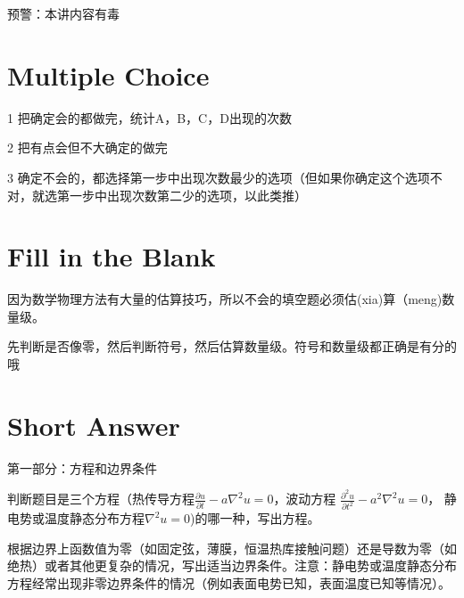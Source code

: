 \documentclass[CJK]{beamer}
\date{}
\begin{document}

\begin{frame}
  \bch
  \bcenter
      {\Large 预警：本讲内容有毒}
      \ecenter
  \ech
\end{frame}


\section{Multiple Choice}

\begin{frame}
\bch
\bitem
\item[1]{把确定会的都做完，统计A，B，C，D出现的次数}
\item[2]{把有点会但不大确定的做完}
\item[3]{确定不会的，都选择第一步中出现次数最少的选项（但如果你确定这个选项不对，就选第一步中出现次数第二少的选项，以此类推）}  
\eitem
\ech
\end{frame}


\section{Fill in the Blank}


\begin{frame}
\bch
因为数学物理方法有大量的估算技巧，所以不会的填空题必须估(xia)算（meng)数量级。

  \skiplines
  
先判断是否像零，然后判断符号，然后估算数量级。符号和数量级都正确是有分的哦\huaixiao
\ech
\end{frame}

\section{Short Answer}

\begin{frame}
\bch
第一部分：方程和边界条件
\bitem
\item{判断题目是三个方程（热传导方程$\frac{\partial u}{\partial t} - a\nabla^2 u = 0$，波动方程 $\frac{\partial^2u}{\partial t^2}-a^2\nabla^2 u = 0$， 静电势或温度静态分布方程$\nabla^2u = 0$)的哪一种，写出方程。}
\item{根据边界上函数值为零（如固定弦，薄膜，恒温热库接触问题）还是导数为零（如绝热）或者其他更复杂的情况，写出适当边界条件。注意：静电势或温度静态分布方程经常出现非零边界条件的情况（例如表面电势已知，表面温度已知等情况）。}
\eitem
\ech
\end{frame}
\end{document}
